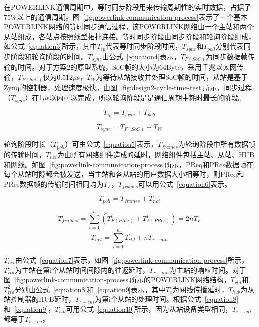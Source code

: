 在POWERLINK通信周期中，等时同步阶段用来传输周期性的实时数据，占据了75\%以上的通信周期。图~\ref{fig:powerlink-communication-process}表示了一个基本POWERLINK网络的等时同步通信过程，该POWERLINK网络由一个主站和两个从站组成，各站点按照线型拓扑连接。等时同步阶段由同步阶段和轮询阶段组成，如公式~\ref{equation3}所示，其中$T_{ip}$代表等时同步阶段时间，$T_{sync}$和$T_{poll}$分别代表同步阶段和轮询阶段的时间。$T_{sync}$由公式~\ref{equation4}表示，$T_{F(SoC)}$为同步数据帧传输的时间。对于方案2的原型系统，SoC帧的大小为64Byte，采用千兆以太网传输，$T_{F(SoC)}$仅为0.512$\mu$s，$T_{W}$为等待从站接收并处理SoC帧的时间，从站是基于Zynq的控制器，处理速度极快。由图~\ref{fig:design2-cycle-time-test}所示，同步过程（$T_{sync}$）在1$\mu$s以内可以完成，所以轮询阶段是是通信周期中耗时最长的阶段。

\begin{equation}
\label{equation3}
T_{ip}=T_{sync}+T_{poll}
\end{equation}

\begin{equation}
\label{equation4}
T_{sync}=T_{F(SoC)}+T_{W}
\end{equation}

轮询阶段时长（$T_{poll}$）可由公式~\ref{equation5}表示，$T_{frames}$为轮询阶段中所有数据帧的传输时间，$T_{net}$为由所有网络组件造成的延时，网络组件包括主站、从站、HUB和网线。如图~\ref{fig:powerlink-communication-process}所示，PReq和PRes数据帧在每个从站时隙都会被发送，当主站和各从站的用户数据大小相等时，则PReq和PRes数据帧的传输时间相同均为$T_{F}$，$T_{frames}$可以用公式~\ref{equation6}表示。

\begin{equation}
\label{equation5}
T_{poll}=T_{frames}+T_{net}
\end{equation}

\begin{equation}
\label{equation6}
T_{frames}=\sum_{i=1}^n(T_{F(PReq)}^{i}+T_{F(PRes)}^{i})=2nT_{F}
\end{equation}
\begin{equation}
\label{equation7}
T_{net}=\sum_{i=1}^nT_{rtd}^{i}+nT_{r-mn}
\end{equation}

$T_{net}$由公式~\ref{equation7}表示，如图~\ref{fig:powerlink-communication-process}所示，$T_{rtd}^{i}$为主站在第i个从站时间间隙内的往返延时，$T_{r-mn}$为主站的响应时间。对于图~\ref{fig:powerlink-communication-process}所示的POWERLINK网络结构，$T_{rtd}^{1}$和$T_{rtd}^{2}$分别由公式~\ref{equation8}和~\ref{equation9}表示，其中$T_{c}$为网线传播延时，$T_{hub}$为从站控制器的HUB延时，$T_{r-cni}$为第i个从站的处理时间。根据公式~\ref{equation8}和~\ref{equation9}，$T_{rtd}^{i}$可用公式~\ref{equation10}所示，因为从站设备类型相同，$T_{r-cni}$都等于$T_{r-cn}$。

